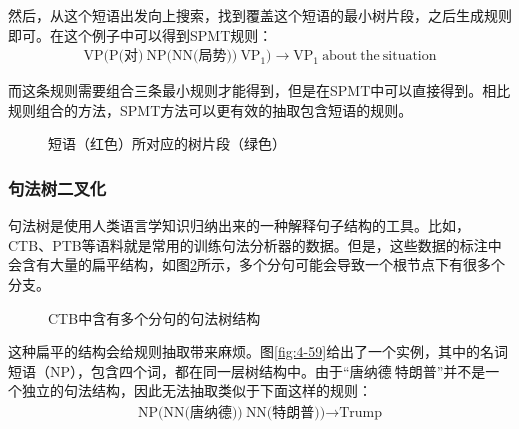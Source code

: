 \parinterval 然后，从这个短语出发向上搜索，找到覆盖这个短语的最小树片段，之后生成规则即可。在这个例子中可以得到SPMT规则：
\begin{eqnarray}
\textrm{VP(P(对)}\ \textrm{NP(NN(局势))}\ \textrm{VP}_1) \rightarrow \textrm{VP}_1\ \textrm{about}\ \textrm{the}\ \textrm{situation} \nonumber
\end{eqnarray}

\parinterval 而这条规则需要组合三条最小规则才能得到，但是在SPMT中可以直接得到。相比规则组合的方法，SPMT方法可以更有效的抽取包含短语的规则。

\begin{figure}[htp]
\centering

\caption{短语（红色）所对应的树片段（绿色）}
\label{fig:4-57}
\end{figure}


\subsubsection{句法树二叉化}

\parinterval 句法树是使用人类语言学知识归纳出来的一种解释句子结构的工具。比如， CTB\cite{xue2005building}、PTB\cite{DBLP:journals/coling/MarcusSM94}等语料就是常用的训练句法分析器的数据。但是，这些数据的标注中会含有大量的扁平结构，如图\ref{fig:4-58}所示，多个分句可能会导致一个根节点下有很多个分支。

\begin{figure}[htp]
\centering

\caption{CTB中含有多个分句的句法树结构}
\label{fig:4-58}
\end{figure}

\parinterval 这种扁平的结构会给规则抽取带来麻烦。图\ref{fig:4-59}给出了一个实例，其中的名词短语（NP），包含四个词，都在同一层树结构中。由于``唐纳德$\ $特朗普''并不是一个独立的句法结构，因此无法抽取类似于下面这样的规则：
\begin{eqnarray}
\textrm{NP(NN(唐纳德))}\ \textrm{NN(特朗普))} \rightarrow \textrm{Trump} \nonumber
\end{eqnarray}

